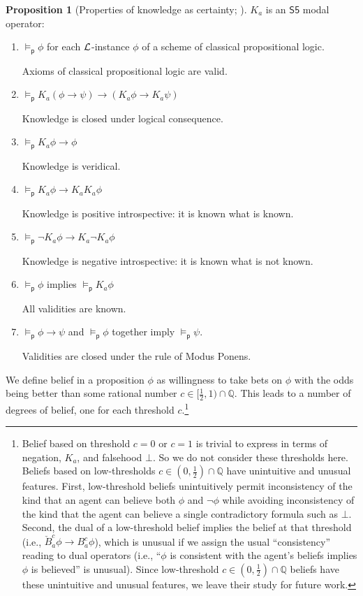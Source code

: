 \documentclass[12pt]{article}
\theoremstyle{definition}
\newtheorem{proposition}[theorem]{Proposition}
\newcommand{\Rat}{\mathbb{Q}}  %
\newcommand{\Lang}{{\cal L}}   %
\newcommand{\modelsp}{\models_{\mathsf{p}}}                  %
\begin{document}
\begin{proposition}[Properties of knowledge as certainty;
  \cite{Eijck2013:lap}]
  \label{prop:knowledge}
  $K_a$ is an $\mathsf{S5}$ modal operator:
  \begin{enumerate}
  \item $\modelsp \phi$ for each $\Lang$-instance $\phi$ of a scheme
    of classical propositional logic.

    Axioms of classical propositional logic are valid.

  \item $\modelsp K_a(\phi\to\psi)\to(K_a\phi\to K_a\psi)$
    
    Knowledge is closed under logical consequence.

  \item $\modelsp K_a\phi\to \phi$

    Knowledge is veridical.
    
  \item $\modelsp K_a\phi\to K_aK_a\phi$

    Knowledge is positive introspective:  it is known what is known.
    
  \item $\modelsp \lnot K_a\phi\to K_a\lnot K_a\phi$

    Knowledge is negative introspective: it is known what is not
    known.
    
  \item $\modelsp\phi$ implies $\modelsp K_a\phi$

    All validities are known.

  \item $\modelsp\phi\to\psi$ and $\modelsp\phi$ together imply
    $\modelsp\psi$.

    Validities are closed under the rule of Modus Ponens.
  \end{enumerate}
\end{proposition}

We define belief in a proposition $\phi$ as willingness to take bets
on $\phi$ with the odds being better than some rational number
$c\in[\frac 12,1)\cap\Rat$.  This leads to a number of degrees of
belief, one for each threshold $c$.\footnote{Belief based on threshold
  $c=0$ or $c=1$ is trivial to express in terms of negation, $K_a$,
  and falsehood $\bot$.  So we do not consider these thresholds here.
  Beliefs based on low-thresholds $c\in(0,\frac 12)\cap\Rat$ have
  unintuitive and unusual features.  First, low-threshold beliefs
  unintuitively permit inconsistency of the kind that an agent can
  believe both $\phi$ and $\lnot\phi$ while avoiding inconsistency of
  the kind that the agent can believe a single contradictory formula
  such as $\bot$.  Second, the dual of a low-threshold belief implies
  the belief at that threshold (i.e., $\check B_a^c\phi\to
  B_a^c\phi$), which is unusual if we assign the usual ``consistency''
  reading to dual operators (i.e., ``$\phi$ is consistent with the
  agent's beliefs implies $\phi$ is believed'' is unusual).  Since
  low-threshold $c\in(0,\frac12)\cap\Rat$ beliefs have these
  unintuitive and unusual features, we leave their study for future
  work.}
\end{document}
